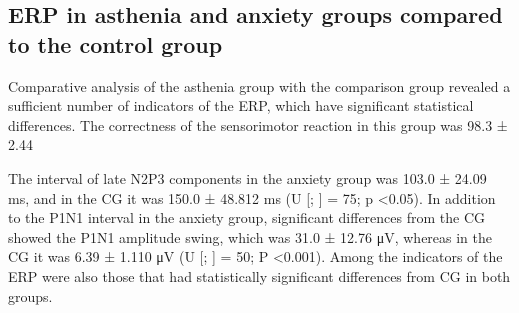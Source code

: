\documentclass[twocolumn]{article}
\begin{document}
\subsection {ERP in asthenia and anxiety groups compared to the control group }
\par Comparative analysis of the asthenia group with the comparison group revealed a sufficient number of indicators of the ERP, which have significant statistical differences. The correctness of the sensorimotor reaction in this group was 98.3 ± 2.44%
\par The interval of late N2P3 components in the anxiety group was 103.0 ± 24.09 ms, and in the CG it was 150.0 ± 48.812 ms (U [\cite{bib15}; \cite{bib20}] = 75; p <0.05). In addition to the P1N1 interval in the anxiety group, significant differences from the CG showed the  P1N1 amplitude swing, which was 31.0 ± 12.76 μV, whereas in the CG it was 6.39 ± 1.110 μV (U [\cite{bib15}; \cite{bib20}] = 50; P <0.001). Among the indicators of the ERP were also those that had statistically significant differences from CG in both groups. 
\end{document}
